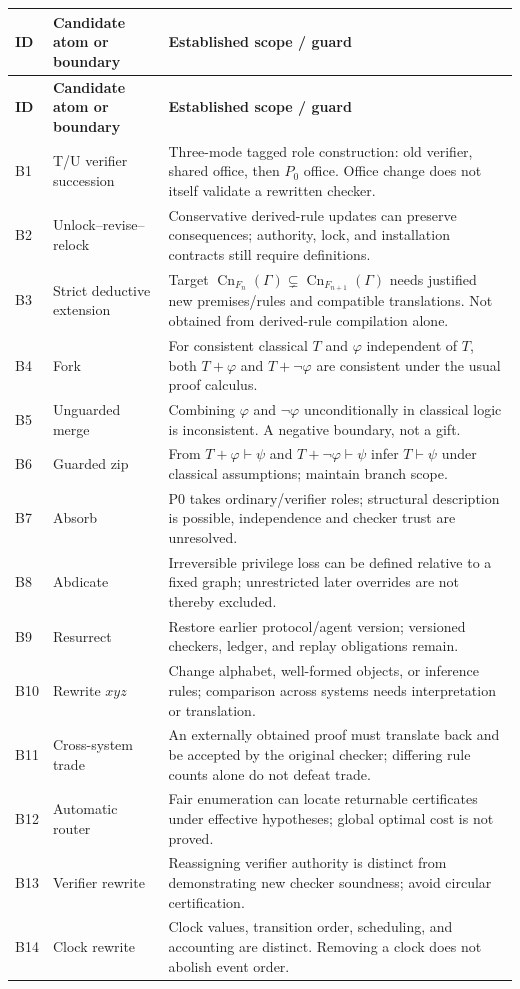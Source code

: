 \documentclass[11pt,letterpaper]{article}
\theoremstyle{definition}\newtheorem{definition}[theorem]{Definition}\newtheorem{example}[theorem]{Example}
\theoremstyle{remark}\newtheorem{remark}[theorem]{Remark}
\newcommand{\Cn}{\operatorname{Cn}}
\begin{document}
\small
\begin{longtable}{@{}p{}p{}p{}@{}}
\toprule
\textbf{ID}&\textbf{Candidate atom or boundary}&\textbf{Established scope / guard}\tabularnewline\midrule
\endfirsthead
\toprule\textbf{ID}&\textbf{Candidate atom or boundary}&\textbf{Established scope / guard}\tabularnewline\midrule\endhead
B1&T/U verifier succession&Three-mode tagged role construction: old verifier, shared office, then $P_0$ office. Office change does not itself validate a rewritten checker.\tabularnewline
B2&Unlock--revise--relock&Conservative derived-rule updates can preserve consequences; authority, lock, and installation contracts still require definitions.\tabularnewline
B3&Strict deductive extension&Target $\Cn_{F_n}(\Gamma)\subsetneq\Cn_{F_{n+1}}(\Gamma)$ needs justified new premises/rules and compatible translations. Not obtained from derived-rule compilation alone.\tabularnewline
B4&Fork&For consistent classical $T$ and $\varphi$ independent of $T$, both $T+\varphi$ and $T+\neg\varphi$ are consistent under the usual proof calculus.\tabularnewline
B5&Unguarded merge&Combining $\varphi$ and $\neg\varphi$ unconditionally in classical logic is inconsistent. A negative boundary, not a gift.\tabularnewline
B6&Guarded zip&From $T+\varphi\vdash\psi$ and $T+\neg\varphi\vdash\psi$ infer $T\vdash\psi$ under classical assumptions; maintain branch scope.\tabularnewline
B7&Absorb&P0 takes ordinary/verifier roles; structural description is possible, independence and checker trust are unresolved.\tabularnewline
B8&Abdicate&Irreversible privilege loss can be defined relative to a fixed graph; unrestricted later overrides are not thereby excluded.\tabularnewline
B9&Resurrect&Restore earlier protocol/agent version; versioned checkers, ledger, and replay obligations remain.\tabularnewline
B10&Rewrite $xyz$&Change alphabet, well-formed objects, or inference rules; comparison across systems needs interpretation or translation.\tabularnewline
B11&Cross-system trade&An externally obtained proof must translate back and be accepted by the original checker; differing rule counts alone do not defeat trade.\tabularnewline
B12&Automatic router&Fair enumeration can locate returnable certificates under effective hypotheses; global optimal cost is not proved.\tabularnewline
B13&Verifier rewrite&Reassigning verifier authority is distinct from demonstrating new checker soundness; avoid circular certification.\tabularnewline
B14&Clock rewrite&Clock values, transition order, scheduling, and accounting are distinct. Removing a clock does not abolish event order.\tabularnewline

\end{longtable}
\end{document}
